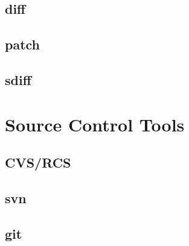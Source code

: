 \subsection{diff}
\subsection{patch}
\subsection{sdiff}

\section{Source Control Tools}
\subsection{CVS/RCS}
\subsection{svn}
\subsection{git}
